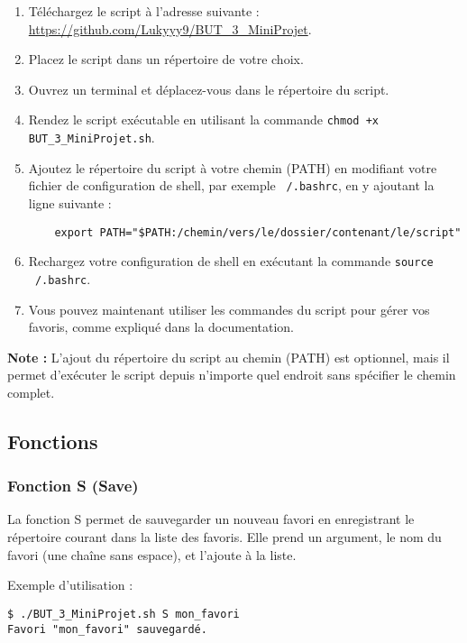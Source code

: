 \documentclass[a4paper, 12pt]{article}
\begin{document}
\begin{enumerate}
    \item Téléchargez le script à l'adresse suivante : \url{https://github.com/Lukyyy9/BUT_3_MiniProjet}.
    \item Placez le script dans un répertoire de votre choix.
    \item Ouvrez un terminal et déplacez-vous dans le répertoire du script.
    \item Rendez le script exécutable en utilisant la commande \texttt{chmod +x BUT_3_MiniProjet.sh}.

    \item Ajoutez le répertoire du script à votre chemin (PATH) en modifiant votre fichier de configuration de shell, par exemple \texttt{~/.bashrc}, en y ajoutant la ligne suivante :

    \begin{verbatim}
    export PATH="$PATH:/chemin/vers/le/dossier/contenant/le/script"
    \end{verbatim}

    \item Rechargez votre configuration de shell en exécutant la commande \texttt{source ~/.bashrc}.

    \item Vous pouvez maintenant utiliser les commandes du script pour gérer vos favoris, comme expliqué dans la documentation.

\end{enumerate}

\textbf{Note :} L'ajout du répertoire du script au chemin (PATH) est optionnel, mais il permet d'exécuter le script depuis n'importe quel endroit sans spécifier le chemin complet.

\subsection{Fonctions}
\subsubsection{Fonction S (Save)}
La fonction S permet de sauvegarder un nouveau favori en enregistrant le répertoire courant dans la liste des favoris. Elle prend un argument, le nom du favori (une chaîne sans espace), et l'ajoute à la liste.

Exemple d'utilisation :
\begin{lstlisting}[style=mystyle]
$ ./BUT_3_MiniProjet.sh S mon_favori
Favori "mon_favori" sauvegardé.
\end{lstlisting}
\end{document}
